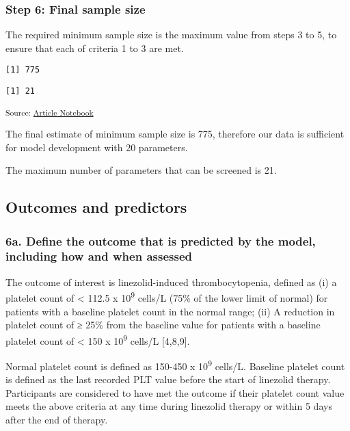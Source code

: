 \documentclass[
  letterpaper,
  DIV=11,
  numbers=noendperiod]{scrartcl}
\begin{document}
\subsubsection{Step 6: Final sample
size}\label{step-6-final-sample-size}

The required minimum sample size is the maximum value from steps 3 to 5,
to ensure that each of criteria 1 to 3 are met.

\begin{verbatim}
[1] 775
\end{verbatim}

\begin{verbatim}
[1] 21
\end{verbatim}

\textsubscript{Source:
\href{https://AnTangQuoc.github.io/LZD-TP-pred-model/index.qmd.html}{Article
Notebook}}

The final estimate of minimum sample size is 775, therefore our data is
sufficient for model development with 20 parameters.

The maximum number of parameters that can be screened is 21.

\subsection{Outcomes and predictors}\label{sec-outcomes-and-predictors}

\subsubsection{6a. Define the outcome that is predicted by the model,
including how and when
assessed}\label{a.-define-the-outcome-that-is-predicted-by-the-model-including-how-and-when-assessed}

The outcome of interest is linezolid-induced thrombocytopenia, defined
as (i) a platelet count of \textless{} 112.5 x 10\textsuperscript{9}
cells/L (75\% of the lower limit of normal) for patients with a baseline
platelet count in the normal range; (ii) A reduction in platelet count
of ≥ 25\% from the baseline value for patients with a baseline platelet
count of \textless{} 150 x 10\textsuperscript{9} cells/L {[}4,8,9{]}.

Normal platelet count is defined as 150-450 x 10\textsuperscript{9}
cells/L. Baseline platelet count is defined as the last recorded PLT
value before the start of linezolid therapy. Participants are considered
to have met the outcome if their platelet count value meets the above
criteria at any time during linezolid therapy or within 5 days after the
end of therapy.
\end{document}
